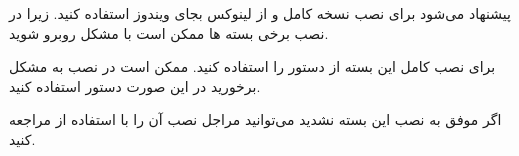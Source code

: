 \begin{note}
پیشنهاد می‌شود برای نصب نسخه کامل  و  از لینوکس بجای ویندوز استفاده کنید. زیرا در نصب برخی بسته ها ممکن است با مشکل روبرو شوید.
\end{note}

برای نصب کامل این بسته از دستور  را استفاده کنید. ممکن است در نصب  به مشکل برخورید در این صورت دستور  استفاده کنید.

اگر موفق به نصب این بسته نشدید می‌توانید مراجل نصب آن را با استفاده از 
\cite{medgyminstall}
مراجعه کنید.
